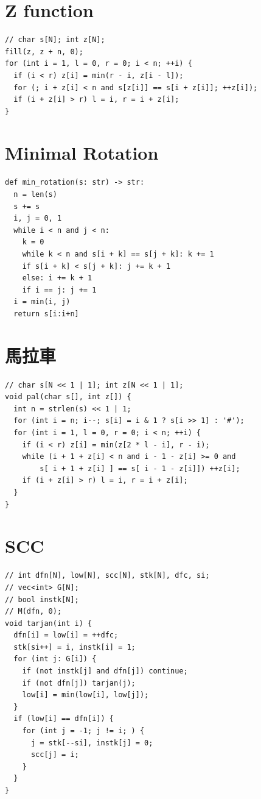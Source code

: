 \documentclass[10pt, a4paper, twocolumn]{article}
\begin{document}
\section{Z function}

\begin{verbatim}
// char s[N]; int z[N];
fill(z, z + n, 0);
for (int i = 1, l = 0, r = 0; i < n; ++i) {
  if (i < r) z[i] = min(r - i, z[i - l]);
  for (; i + z[i] < n and s[z[i]] == s[i + z[i]]; ++z[i]);
  if (i + z[i] > r) l = i, r = i + z[i];
}
\end{verbatim}

\section{Minimal Rotation}

\begin{verbatim}
def min_rotation(s: str) -> str:
  n = len(s)
  s += s
  i, j = 0, 1
  while i < n and j < n:
    k = 0
    while k < n and s[i + k] == s[j + k]: k += 1
    if s[i + k] < s[j + k]: j += k + 1
    else: i += k + 1
    if i == j: j += 1
  i = min(i, j)
  return s[i:i+n]
\end{verbatim}

\section{馬拉車}

\begin{verbatim}
// char s[N << 1 | 1]; int z[N << 1 | 1];
void pal(char s[], int z[]) {
  int n = strlen(s) << 1 | 1;
  for (int i = n; i--; s[i] = i & 1 ? s[i >> 1] : '#');
  for (int i = 1, l = 0, r = 0; i < n; ++i) {
    if (i < r) z[i] = min(z[2 * l - i], r - i);
    while (i + 1 + z[i] < n and i - 1 - z[i] >= 0 and 
        s[ i + 1 + z[i] ] == s[ i - 1 - z[i]]) ++z[i];
    if (i + z[i] > r) l = i, r = i + z[i];
  }
}
\end{verbatim}

\section{SCC}

\begin{verbatim}
// int dfn[N], low[N], scc[N], stk[N], dfc, si;
// vec<int> G[N];
// bool instk[N];
// M(dfn, 0);
void tarjan(int i) {
  dfn[i] = low[i] = ++dfc;
  stk[si++] = i, instk[i] = 1;
  for (int j: G[i]) {
    if (not instk[j] and dfn[j]) continue;
    if (not dfn[j]) tarjan(j);
    low[i] = min(low[i], low[j]);
  }
  if (low[i] == dfn[i]) {
    for (int j = -1; j != i; ) {
      j = stk[--si], instk[j] = 0;
      scc[j] = i;
    }
  }
}
\end{verbatim}
\end{document}
